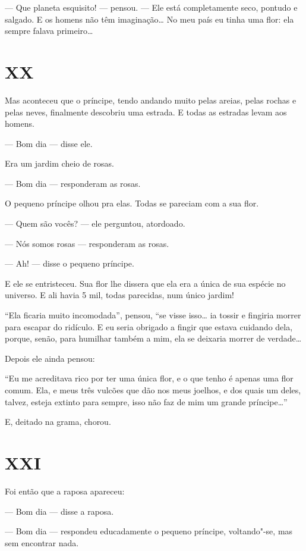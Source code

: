\begin{Parallel}[p]{}{}
{--- Que planeta esquisito! --- pensou. --- Ele está completamente seco,
pontudo e salgado. E os homens não têm imaginação\ldots{} No meu país eu
tinha uma flor: ela sempre falava primeiro\ldots{}

\section{XX}

Mas aconteceu que o príncipe, tendo andando muito pelas areias, pelas
rochas e pelas neves, finalmente descobriu uma estrada. E todas as
estradas levam aos homens.

--- Bom dia --- disse ele.

Era um jardim cheio de rosas.

--- Bom dia --- responderam as rosas.

O pequeno príncipe olhou pra elas. Todas se pareciam com a sua flor.

--- Quem são vocês? --- ele perguntou, atordoado.

--- Nós somos rosas --- responderam as rosas.

--- Ah! --- disse o pequeno príncipe.

E ele se entristeceu. Sua flor lhe dissera que ela era a única de sua
espécie no universo. E ali havia 5 mil, todas parecidas, num único
jardim!

``Ela ficaria muito incomodada'', pensou, ``se visse isso\ldots{} ia tossir e
fingiria morrer para escapar do ridículo. E eu seria obrigado a fingir
que estava cuidando dela, porque, senão, para humilhar também a mim, ela
se deixaria morrer de verdade\ldots{}

Depois ele ainda pensou:

``Eu me acreditava rico por ter uma única flor, e o que tenho é apenas
uma flor comum. Ela, e meus três vulcões que dão nos meus joelhos, e dos
quais um deles, talvez, esteja extinto para sempre, isso não faz de mim
um grande príncipe\ldots{}''

E, deitado na grama, chorou.

\section{XXI}

Foi então que a raposa apareceu:

--- Bom dia --- disse a raposa.

--- Bom dia --- respondeu educadamente o pequeno príncipe, voltando"-se, mas
sem encontrar nada.

}
\end{Parallel}
